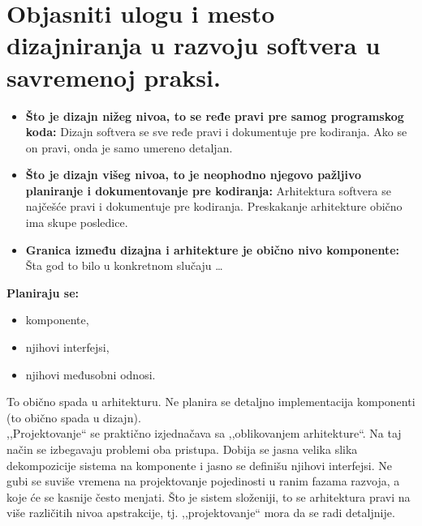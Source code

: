 \documentclass[a4paper]{article}
\begin{document}
\section{Objasniti ulogu i mesto dizajniranja u razvoju softvera u savremenoj praksi.}
  \begin{itemize}
    \item \textbf{Što je dizajn nižeg nivoa, to se ređe pravi pre samog programskog koda:} Dizajn softvera se 
          sve ređe pravi i dokumentuje pre kodiranja. Ako se on pravi, onda je samo umereno
          detaljan. \\
    \item \textbf{Što je dizajn višeg nivoa, to je neophodno njegovo pažljivo planiranje 
          i dokumentovanje pre kodiranja:} Arhitektura softvera se najčešće pravi i dokumentuje pre kodiranja.
          Preskakanje arhitekture obično ima skupe posledice. \\
    \item \textbf{Granica između dizajna i arhitekture je obično nivo komponente:} Šta god to bilo u 
    konkretnom slučaju \dots
  \end{itemize}
  \textbf{Planiraju se:}
  \begin{itemize}
    \item komponente,
    \item njihovi interfejsi,
    \item njihovi međusobni odnosi.
  \end{itemize}
  To obično spada u arhitekturu. Ne planira se detaljno implementacija komponenti 
  (to obično spada u dizajn).\\
  \indent ,,Projektovanje`` se praktično izjednačava sa ,,oblikovanjem arhitekture``. Na taj način
  se izbegavaju problemi oba pristupa. Dobija se jasna velika slika dekompozicije sistema na 
  komponente i jasno se definišu njihovi interfejsi. Ne gubi se suviše vremena na projektovanje
  pojedinosti u ranim fazama razvoja, a koje će se kasnije često menjati. Što je sistem složeniji,
  to se arhitektura pravi na više različitih nivoa apstrakcije, tj. ,,projektovanje`` mora da se
  radi detaljnije.
\end{document}
